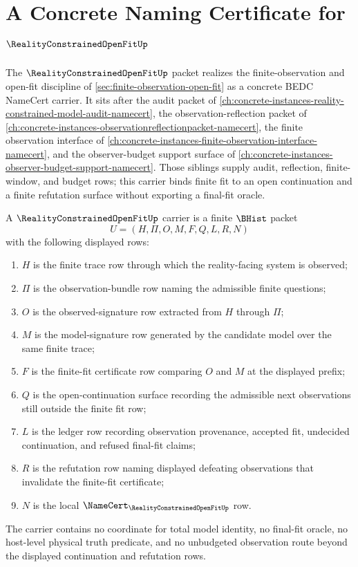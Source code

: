 \chapter{A Concrete Naming Certificate for $\RealityConstrainedOpenFitUp$}
\label{ch:concrete-instances-reality-constrained-open-fit-namecert}

The $\RealityConstrainedOpenFitUp$ packet realizes the finite-observation and open-fit discipline of \autoref{sec:finite-observation-open-fit} as a concrete BEDC NameCert carrier. It sits after the audit packet of \autoref{ch:concrete-instances-reality-constrained-model-audit-namecert}, the observation-reflection packet of \autoref{ch:concrete-instances-observationreflectionpacket-namecert}, the finite observation interface of \autoref{ch:concrete-instances-finite-observation-interface-namecert}, and the observer-budget support surface of \autoref{ch:concrete-instances-observer-budget-support-namecert}. Those siblings supply audit, reflection, finite-window, and budget rows; this carrier binds finite fit to an open continuation and a finite refutation surface without exporting a final-fit oracle.

\begin{definition}
\label{def:reality-constrained-open-fit-carrier}
A $\RealityConstrainedOpenFitUp$ carrier is a finite $\BHist$ packet
$$
U=(H,\Pi,O,M,F,Q,L,R,N)
$$
with the following displayed rows:
\begin{enumerate}
\item $H$ is the finite trace row through which the reality-facing system is observed;
\item $\Pi$ is the observation-bundle row naming the admissible finite questions;
\item $O$ is the observed-signature row extracted from $H$ through $\Pi$;
\item $M$ is the model-signature row generated by the candidate model over the same finite trace;
\item $F$ is the finite-fit certificate row comparing $O$ and $M$ at the displayed prefix;
\item $Q$ is the open-continuation surface recording the admissible next observations still outside the finite fit row;
\item $L$ is the ledger row recording observation provenance, accepted fit, undecided continuation, and refused final-fit claims;
\item $R$ is the refutation row naming displayed defeating observations that invalidate the finite-fit certificate;
\item $N$ is the local $\NameCert_{\RealityConstrainedOpenFitUp}$ row.
\end{enumerate}
The carrier contains no coordinate for total model identity, no final-fit oracle, no host-level physical truth predicate, and no unbudgeted observation route beyond the displayed continuation and refutation rows.
\end{definition}

